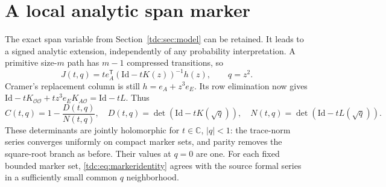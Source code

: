 \documentclass[11pt]{article}
\theoremstyle{definition}\newtheorem{definition}[theorem]{Definition}
\theoremstyle{remark}\newtheorem{remark}[theorem]{Remark}
\newcommand{\Id}{\mathrm{Id}}
\newcommand{\OO}{\mathcal O}
\begin{document}
\section{A local analytic span marker}
\label{tdc:sec:marker}
The exact span variable from Section~\ref{tdc:sec:model} can be retained. It leads to a signed analytic extension, independently of any probability interpretation. A primitive size-$m$ path has $m-1$ compressed transitions, so
\[
 J(t,q)=t e_A^{\mathsf T}(\Id-tK(z))^{-1}h(z),\qquad q=z^2.
\]
Cramer's replacement column is still $h=e_A+z^3e_E$. Its row elimination now gives
$\Id-tK_{\OO\OO}+tz^3e_EK_{A\OO}=\Id-tL$. Thus
\begin{equation}\label{tdc:eq:markeridentity}
 C(t,q)=1-\frac{D(t,q)}{N(t,q)},\quad
 D(t,q)=\det(\Id-tK(\sqrt q)),\quad
 N(t,q)=\det(\Id-tL(\sqrt q)).
\end{equation}
These determinants are jointly holomorphic for $t\in\mathbb C$, $|q|<1$: the trace-norm series converges uniformly on compact marker sets, and parity removes the square-root branch as before. Their values at $q=0$ are one. For each fixed bounded marker set, \eqref{tdc:eq:markeridentity} agrees with the source formal series in a sufficiently small common $q$ neighborhood.
\end{document}
